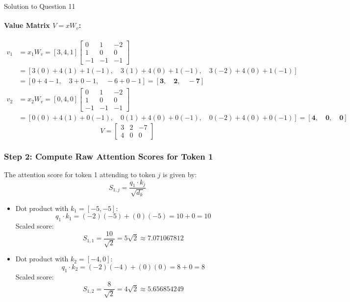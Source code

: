 \documentclass[11pt,a4paper]{article}
\begin{document}
\begin{solutionbox}{Solution to Question 11}
\paragraph{Value Matrix $V = x W_v$:}
\begin{align*}
v_{1} &= x_1 W_v = [3, 4, 1] \begin{bmatrix} 0 & 1 & -2 \\ 1 & 0 & 0 \\ -1 & -1 & -1 \end{bmatrix} \\
&= [3(0) + 4(1) + 1(-1), \quad 3(1) + 4(0) + 1(-1), \quad 3(-2) + 4(0) + 1(-1)] \\
&= [0 + 4 - 1, \quad 3 + 0 - 1, \quad -6 + 0 - 1] = \mathbf{[3, \quad 2, \quad -7]} \\[0.2cm]
v_{2} &= x_2 W_v = [0, 4, 0] \begin{bmatrix} 0 & 1 & -2 \\ 1 & 0 & 0 \\ -1 & -1 & -1 \end{bmatrix} \\
&= [0(0) + 4(1) + 0(-1), \quad 0(1) + 4(0) + 0(-1), \quad 0(-2) + 4(0) + 0(-1)] = \mathbf{[4, \quad 0, \quad 0]}
\end{align*}
\[
V = \begin{bmatrix} 3 & 2 & -7 \\ 4 & 0 & 0 \end{bmatrix}
\]

\subsubsection*{Step 2: Compute Raw Attention Scores for Token 1}
The attention score for token 1 attending to token $j$ is given by:
\[
S_{1,j} = \frac{q_1 \cdot k_j}{\sqrt{d_k}}
\]
\begin{itemize}
    \item Dot product with $k_1 = [-5, -5]$:
    \[
    q_1 \cdot k_1 = (-2)(-5) + (0)(-5) = 10 + 0 = 10
    \]
    Scaled score:
    \[
    S_{1,1} = \frac{10}{\sqrt{2}} = 5\sqrt{2} \approx 7.071067812
    \]
    \item Dot product with $k_2 = [-4, 0]$:
    \[
    q_1 \cdot k_2 = (-2)(-4) + (0)(0) = 8 + 0 = 8
    \]
    Scaled score:
    \[
    S_{1,2} = \frac{8}{\sqrt{2}} = 4\sqrt{2} \approx 5.656854249
    \]
\end{itemize}


\end{solutionbox}
\end{document}
